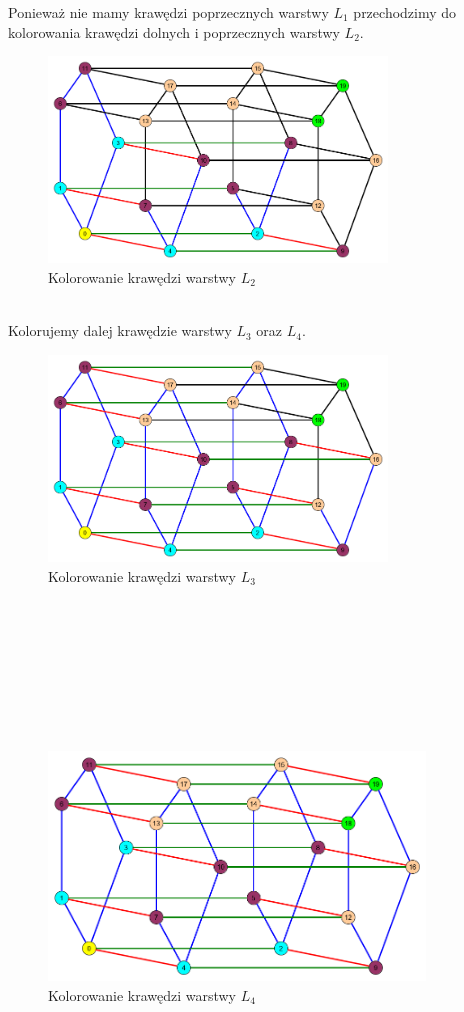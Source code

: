 \documentclass[12pt,a4paper,titlepage]{article}
\newcommand\tab[1][1cm]{\hspace*{#1}}
\begin{document}
Ponieważ nie mamy krawędzi poprzecznych warstwy $L_1$ przechodzimy do kolorowania krawędzi dolnych i poprzecznych warstwy $L_2$.
\begin{figure}[h]
\centering
\includegraphics[width = 9cm]{kol3.png}
\caption{Kolorowanie krawędzi warstwy $L_2$}
\end{figure}
\\
\tab[0.6cm]Kolorujemy dalej krawędzie warstwy $L_3$ oraz $L_4$.
\begin{figure}[h]
\centering
\includegraphics[width = 9cm]{kol4.png}
\caption{Kolorowanie krawędzi warstwy $L_3$}
\end{figure}
\\
\\
\\
\\
\\
\\
\\
\begin{figure}[h]
\centering
\includegraphics[width = 10cm]{kol5.png}
\caption{Kolorowanie krawędzi warstwy $L_4$}
\end{figure}
\end{document}
